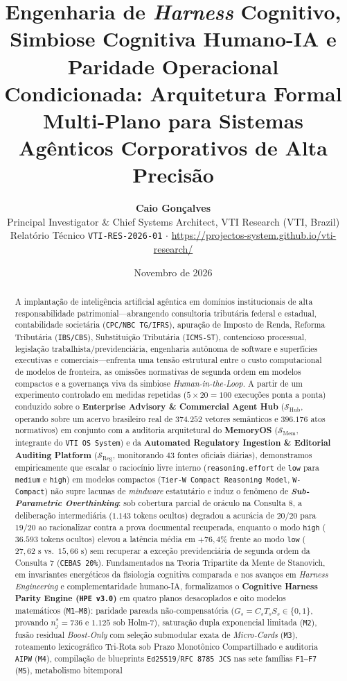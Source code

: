 \documentclass[10pt,twocolumn]{article}
\title{\vspace{-1.2em}\textbf{Engenharia de \emph{Harness} Cognitivo, Simbiose Cognitiva Humano-IA e Paridade Operacional Condicionada: Arquitetura Formal Multi-Plano para Sistemas Ag\^enticos Corporativos de Alta Precis\~ao}}
\author{
  \textbf{Caio Gon\c{c}alves}\\
  \small Principal Investigator \& Chief Systems Architect, VTI Research (VTI, Brazil)\\
  \small Relat\'orio T\'ecnico \texttt{VTI-RES-2026-01} $\cdot$ \url{https://projectos-system.github.io/vti-research/}
}
\date{Novembro de 2026}
\begin{document}
\maketitle

\begin{abstract}
A implanta\c{c}\~ao de intelig\^encia artificial ag\^entica em dom\'inios institucionais de alta responsabilidade patrimonial---abrangendo consultoria tribut\'aria federal e estadual, contabilidade societ\'aria (\texttt{CPC/NBC TG/IFRS}), apura\c{c}\~ao de Imposto de Renda, Reforma Tribut\'aria (\texttt{IBS/CBS}), Substitui\c{c}\~ao Tribut\'aria (\texttt{ICMS-ST}), contencioso processual, legisla\c{c}\~ao trabalhista/previdenci\'aria, engenharia aut\^onoma de software e superf\'icies executivas e comerciais---enfrenta uma tens\~ao estrutural entre o custo computacional de modelos de fronteira, as omiss\~oes normativas de segunda ordem em modelos compactos e a governan\c{c}a viva da simbiose \emph{Human-in-the-Loop}. A partir de um experimento controlado em medidas repetidas ($5 \times 20 = 100$ execu\c{c}\~oes ponta a ponta) conduzido sobre o \textbf{Enterprise Advisory \& Commercial Agent Hub} ($\mathcal{S}_{\mathrm{Hub}}$, operando sobre um acervo brasileiro real de $374.252$ vetores sem\^anticos e $396.176$ atos normativos) em conjunto com a auditoria arquitetural do \textbf{MemoryOS} ($\mathcal{S}_{\mathrm{Mem}}$, integrante do \texttt{VTI OS System}) e da \textbf{Automated Regulatory Ingestion \& Editorial Auditing Platform} ($\mathcal{S}_{\mathrm{Reg}}$, monitorando $43$ fontes oficiais di\'arias), demonstramos empiricamente que escalar o racioc\'inio livre interno (\texttt{reasoning.effort} de \texttt{low} para \texttt{medium} e \texttt{high}) em modelos compactos (\texttt{Tier-W Compact Reasoning Model}, \texttt{W-Compact}) n\~ao supre lacunas de \emph{mindware} estatut\'ario e induz o fen\^omeno de \textbf{\emph{Sub-Parametric Overthinking}}: sob cobertura parcial de or\'aculo na Consulta 8, a delibera\c{c}\~ao intermedi\'aria ($1.143$ tokens ocultos) degradou a acur\'acia de $20/20$ para $19/20$ ao racionalizar contra a prova documental recuperada, enquanto o modo \texttt{high} ($36.593$ tokens ocultos) elevou a lat\^encia m\'edia em $+76,4\%$ frente ao modo \texttt{low} ($27,62\text{ s}$ vs.\ $15,66\text{ s}$) sem recuperar a exce\c{c}\~ao previdenci\'aria de segunda ordem da Consulta 7 (\texttt{CEBAS 20\%}). Fundamentados na Teoria Tripartite da Mente de Stanovich, em invariantes energ\'eticos da fisiologia cognitiva comparada e nos avan\c{c}os em \emph{Harness Engineering} e complementaridade humano-IA, formalizamos o \textbf{Cognitive Harness Parity Engine (\texttt{HPE v3.0})} em quatro planos desacoplados e oito modelos matem\'aticos (\texttt{M1--M8}): paridade pareada n\~ao-compensat\'oria ($G_s = C_s T_s S_s \in \{0,1\}$, provando $n_j^* = 736$ e $1.125$ sob Holm-7), satura\c{c}\~ao dupla exponencial limitada (\texttt{M2}), fus\~ao residual \emph{Boost-Only} com sele\c{c}\~ao submodular exata de \emph{Micro-Cards} (\texttt{M3}), roteamento lexicogr\'afico Tri-Rota sob Prazo Monot\^onico Compartilhado e auditoria \texttt{AIPW} (\texttt{M4}), compila\c{c}\~ao de blueprints \texttt{Ed25519}/\texttt{RFC 8785 JCS} nas sete fam\'ilias \texttt{F1--F7} (\texttt{M5}), metabolismo bitemporal 
\end{abstract}
\end{document}

